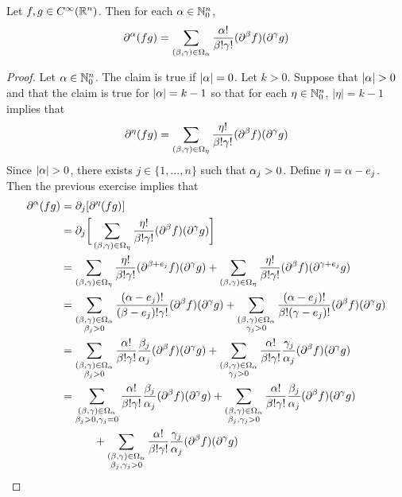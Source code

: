 \documentclass{book}
\begin{document}
	\begin{ex} 
		Let $f, g \in C^{\infty}(\mathbb{R}^n)$. Then for each $\alpha \in \mathbb{N}_0^n$, 
		$$\partial^{\alpha}(fg) = \sum_{(\beta, \gamma) \in \Omega_{\alpha}} \frac{\alpha!}{\beta !\gamma!}( \partial^{\beta} f) (\partial^{\gamma}g)$$  
	\end{ex}

	\begin{proof}
		Let $\alpha \in \mathbb{N}^n_0$. The claim is true if $|\alpha| = 0$. Let $k > 0$. Suppose that $|\alpha| > 0$ and that the claim is true for $|\alpha| = k - 1$ so that for each $\eta \in \mathbb{N}^n_0$, $|\eta| = k-1$ implies that 
		$$\partial^{\eta}(fg) = \sum_{(\beta, \gamma) \in \Omega_{\eta}} \frac{\eta!}{\beta !\gamma!}( \partial^{\beta} f) (\partial^{\gamma}g)$$ 
		Since $|\alpha| > 0$, there exists $j \in \{1, \ldots, n\}$ such that $\alpha_j > 0$. Define $\eta = \alpha - e_j$. Then the previous exercise implies that 
		\begin{align*}
			\p^{\al}(fg)
			&= \p_j [\p^{\eta}(fg)] \\
			&= \p_j \bigg[ \sum_{(\be, \gam) \in \Om_{\eta}} \frac{\eta!}{\be !\gam!}( \p^{\be} f) (\p^{\gam}g) \bigg] \\
			&= \sum_{(\be, \gam) \in \Om_{\eta}} \frac{\eta!}{\be !\gam!}(\p^{\be + e_j} f) (\p^{\gam}g) + \sum_{(\be, \gam) \in \Om_{\eta}} \frac{\eta!}{\be !\gam!} (\p^{\be} f) (\p^{\gam + e_j}g) \\
			&= \sum_{\substack{(\be, \gam) \in \Om_{\al} \\ \be_j > 0}} \frac{(\al - e_j)!}{(\be - e_j) !\gam!}(\p^{\be} f) (\p^{\gam}g) + \sum_{\substack{(\be, \gam) \in \Om_{\al} \\ \gam_j > 0}} \frac{(\al - e_j)!}{\be ! (\gam - e_j)!} (\p^{\be} f) (\p^{\gam}g) \\
			& = \sum_{\substack{(\be, \gam) \in \Om_{\al} \\ \be_j > 0}} \frac{\al!}{\be !\gam !} \frac{\be_j}{\al_j}(\p^{\be} f) (\p^{\gam}g) + \sum_{\substack{(\be, \gam) \in \Om_{\al} \\ \gam_j > 0}} \frac{\al!}{\be ! \gam !}\frac{\gam_j}{\al_j} (\p^{\be} f) (\p^{\gam}g) \\
			& = \sum_{\substack{(\be, \gam) \in \Om_{\al} \\ \be_j > 0, \gam_j = 0}} \frac{\al!}{\be !\gam !} \frac{\be_j}{\al_j}(\p^{\be} f) (\p^{\gam}g) 
			+ \sum_{\substack{(\be, \gam) \in \Om_{\al} \\ \be_j, \gam_j > 0}} \frac{\al!}{\be !\gam !} \frac{\be_j}{\al_j}(\p^{\be} f) (\p^{\gam}g) \\
			& \quad \quad \quad + \sum_{\substack{(\be, \gam) \in \Om_{\al} \\ \be_j, \gam_j > 0}} \frac{\al!}{\be ! \gam !}\frac{\gam_j}{\al_j} (\p^{\be} f) (\p^{\gam}g) 

\end{align*}
\end{proof}
\end{document}
